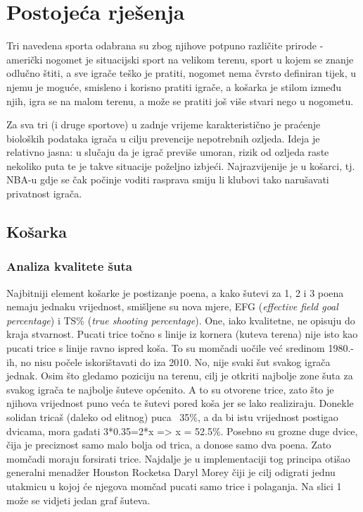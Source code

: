 \documentclass{ferseminar}
\begin{document}
\section{Postojeća rješenja}

Tri navedena sporta odabrana su zbog njihove potpuno različite prirode - američki nogomet je situacijski sport na velikom terenu, sport u kojem se znanje odlučno štiti, a sve igrače teško je pratiti, nogomet nema čvrsto definiran tijek, u njemu je moguće, smisleno i korisno pratiti igrače, a košarka je stilom između njih, igra se na malom terenu, a može se pratiti još više stvari nego u nogometu.

Za sva tri (i druge sportove) u zadnje vrijeme karakteristično je praćenje bioloških podataka igrača u cilju prevencije nepotrebnih ozljeda. Ideja je relativno jasna: u slučaju da je igrač previše umoran, rizik od ozljeda raste nekoliko puta te je takve situacije poželjno izbjeći. Najrazvijenije je u košarci, tj. NBA-u gdje se čak počinje voditi rasprava smiju li klubovi tako narušavati privatnost igrača. \cite{bio}

\subsection{Košarka}

\subsubsection{Analiza kvalitete šuta} 
Najbitniji element košarke je postizanje poena, a kako šutevi za 1, 2 i 3 poena nemaju jednaku vrijednost, smišljene su nova mjere, EFG (\textit{effective field goal percentage}) i TS\% (\textit{true shooting percentage}). One, iako kvalitetne, ne opisuju do kraja stvarnost. Pucati trice točno s linije iz kornera (kuteva terena) nije isto kao pucati trice s linije ravno ispred koša. To su momčadi uočile već sredinom 1980.-ih, no nisu počele iskorištavati do iza 2010. \cite{corner3s} No, nije svaki šut svakog igrača jednak. Osim što gledamo poziciju na terenu, cilj je otkriti najbolje zone šuta za svakog igrača te najbolje šuteve općenito. A to su otvorene trice, zato što je njihova vrijednost puno veća te šutevi pored koša jer se lako realiziraju. Donekle solidan tricaš (daleko od elitnog) puca ~35\%, a da bi istu vrijednost postigao dvicama, mora gađati 3*0.35=2*x => x = 52.5\%. Posebno su grozne duge dvice, čija je preciznost samo malo bolja od trica, a donose samo dva poena. Zato momčadi moraju forsirati trice. \cite{NBAshots} Najdalje je u implementaciji tog principa otišao generalni menadžer Houston Rocketsa Daryl Morey čiji je cilj odigrati jednu utakmicu u kojoj će njegova momčad pucati samo trice i polaganja. Na slici 1 može se vidjeti jedan graf šuteva.
\end{document}
